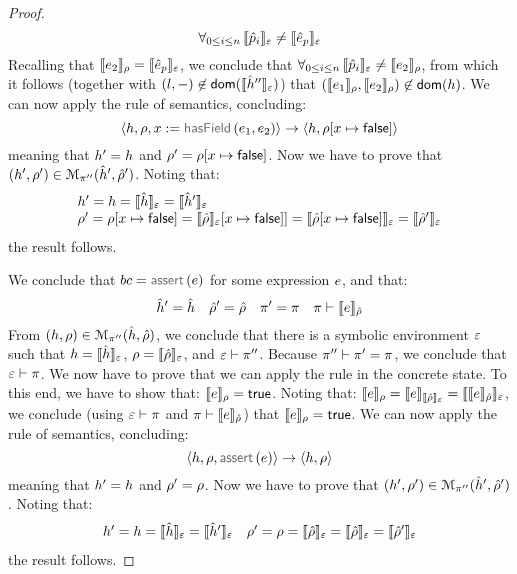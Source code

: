 \begin{proof}
$$
  \forall_{0 \leq i \leq n}  \, \symbeval{\sexprp_i}{\senv} \neq \symbeval{\sexpr_p}{\senv} 
$$
Recalling that $\symbeval{\jsilexpr_2}{\store} = \symbeval{\sexpr_p}{\senv}$, we conclude that  
$
  \forall_{0 \leq i \leq n}  \, \symbeval{\sexprp_i}{\senv} \neq \symbeval{\jsilexpr_2}{\store}
$, from which it follows (together with $(\loc, -) \not\in \domain(\semexpr{\sheap''}{\senv})$) that 
$(\symbeval{\jsilexpr_1}{\store}, \symbeval{\jsilexpr_2}{\store}) \not\in \domain(\heap)$.
%
We can now apply the  rule of \jsil semantics, concluding: 
$$
   \semtrans{\heap, \store, \jvar := \hasfield(\jsilexpr_1, \jsilexpr_2)}{\heap,  \store[\jvar \mapsto \jfalse]}
$$
meaning that $\heap' = \heap$ and $\store' = \store[\jvar \mapsto \jfalse]$. 
%
Now we have to prove that $(\heap', \store') \in \smodels{\sheap', \sstore'}{\pc''}$.
Noting that:
$$
\begin{array}{l}
\heap' = \heap = \semexpr{\sheap}{\senv} = \semexpr{\sheap'}{\senv} \\
 \store' = \store[\jvar \mapsto \jfalse] = \symbeval{\sstore}{\senv}[\jvar \mapsto \jfalse]] = \symbeval{\sstore[\jvar \mapsto \jfalse]}{\senv} = \symbeval{\sstore'}{\senv} 
\end{array}
$$
the result follows. 
\vspace{6pt}


\noindent{}
We conclude that  $\bcmd = \assert(\jsilexpr)$ for some expression $\jsilexpr$, and that: 
$$
  \sheap' = \sheap 
  \quad
  \sstore' =  \sstore 
  \quad
  \pc' = \pc
  \quad
  \pc \vdash  \symbeval{\jsilexpr}{\sstore}
$$ 
From $(\heap, \store) \in \smodels{\sheap, \sstore}{\pc''}$, we conclude that there is a symbolic environment
$\senv$ such that $\heap = \semexpr{\sheap}{\senv}$, $\store = \semexpr{\sstore}{\senv}$, and 
$\senv \vdash \pc''$. Because $\pc'' \vdash \pc' = \pc$, we conclude that $\senv \vdash \pc$. 
We now have to prove that we can apply the  rule in the concrete state.
To this end, we have to show that: $\symbeval{\jsilexpr}{\store} = \jtrue$. 
Noting that:
$
  \symbeval{\jsilexpr}{\store} = \symbeval{\jsilexpr}{\symbeval{\sstore}{\senv}} 
         = \symbeval{\symbeval{\jsilexpr}{\sstore}}{\senv} 
$, we conclude (using $\senv \vdash \pc$ and $\pc \vdash  \symbeval{\jsilexpr}{\sstore}$) that 
$\symbeval{\jsilexpr}{\store} = \jtrue$. 
We can now apply the  rule of \jsil semantics, concluding: 
$$
   \semtrans{\heap, \store, \assert(\jsilexpr)}{\heap,  \store}
$$
meaning that $\heap' = \heap$ and $\store' = \store$. 
%
Now we have to prove that $(\heap', \store') \in \smodels{\sheap', \sstore'}{\pc''}$.
Noting that:
$$
\begin{array}{l}
\heap' = \heap = \semexpr{\sheap}{\senv} = \semexpr{\sheap'}{\senv}
 \quad 
 \store' = \store = \symbeval{\sstore}{\senv} = \symbeval{\sstore}{\senv} = \symbeval{\sstore'}{\senv} 
\end{array}
$$
the result follows. 
\vspace{6pt}


\end{proof}
